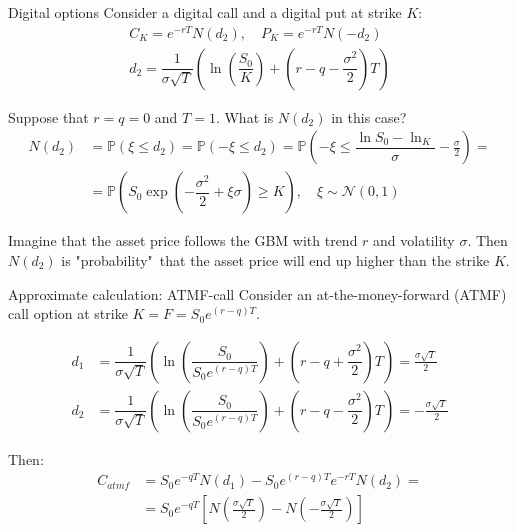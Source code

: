 \documentclass{beamer}
\begin{document}
\begin{frame}{Digital options}
\justify
Consider a digital call and a digital put at strike $K$:
\begin{align*}
C_K = e^{-rT}N(d_2), \quad P_K = e^{-rT}N(-d_2) \\
d_2 = \dfrac{1}{\sigma\sqrt{T}}\left( \ln\left(\dfrac{S_0}{K}\right) + \left(r -q- \dfrac{\sigma^2}{2}\right)T\right)
\end{align*}

\justify
Suppose that $r=q=0$ and $T=1$. What is $N(d_2)$ in this case?
\begin{align*}
N(d_2) &= \mathbb{P}(\xi \le d_2) = 
\mathbb{P}(-\xi \le d_2) = \mathbb{P}\left(-\xi \le \dfrac{\ln S_0 - \ln_K}{\sigma} - \frac{\sigma}{2}\right) = \\
&= \mathbb{P}\left(S_0\exp\left(-\dfrac{\sigma^2}{2} + \xi\sigma\right) \ge K\right),
\quad \xi \sim \mathcal{N}(0,1)
\end{align*}

\justify
Imagine that the asset price follows the GBM with trend $r$ and volatility $\sigma$. Then $N(d_2)$ is "probability"\ that the asset price will end up higher than the strike $K$.

\end{frame}




\begin{frame}{Approximate calculation: ATMF-call}
\justify
Consider an at-the-money-forward (ATMF) call option at strike $K = F = S_0e^{(r-q)T}$.

\begin{align*}
d_1 &= \dfrac{1}{\sigma\sqrt{T}}\left( \ln\left(\dfrac{S_0}{S_0e^{(r-q)T}}\right) + \left(r -q + \dfrac{\sigma^2}{2}\right)T\right) = \frac{\sigma \sqrt{T}}{2} \\
d_2 &= \dfrac{1}{\sigma\sqrt{T}}\left( \ln\left(\dfrac{S_0}{S_0e^{(r-q)T}}\right) + \left(r -q- \dfrac{\sigma^2}{2}\right)T\right) = -\frac{\sigma \sqrt{T}}{2}
\end{align*}

Then:
\begin{align*}
C_{atmf} &= S_0e^{-qT}N(d_1) - S_0e^{(r-q)T}e^{-rT}N(d_2) = \\
&= S_0e^{-qT}\left[
N\left(\frac{\sigma \sqrt{T}}{2}\right) - N\left(-\frac{\sigma \sqrt{T}}{2}\right)
\right]
\end{align*}
\end{frame}
\end{document}
